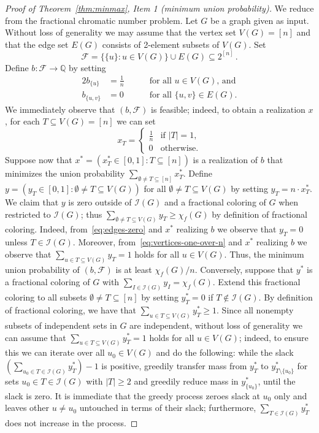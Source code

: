 \documentclass[11pt]{article}
\begin{document}
\begin{proof}[Proof of Theorem~\ref{thm:minmax}, Item 1 (minimum union probability)]
We reduce from the fractional chromatic number problem. 
Let $G$ be a graph given as input.
Without loss of generality we may assume that the vertex set $V(G)=[n]$
and that the edge set $E(G)$ consists of 2-element subsets of $V(G)$.
Set 
\[
\mathcal{F}=\{\{u\}:u\in V(G)\}\cup E(G)\subseteq 2^{[n]}\,.
\]
Define $b:\mathcal{F}\rightarrow\mathbb{Q}$ by setting
\begin{alignat}{2}
\label{eq:vertices-one-over-n}
b_{\{u\}}&=\frac{1}{n}&\quad&\text{ for all $u\in V(G)$, and}\\
\label{eq:edges-zero}
b_{\{u,v\}}&=0&\quad&\text{ for all $\{u,v\}\in E(G)$}.
\end{alignat}
We immediately observe that $(b,\mathcal{F})$ is feasible; indeed,
to obtain a realization $x$, for each $T\subseteq V(G)=[n]$ we can set
\begin{equation}
\label{eq:min-union-feasible}
x_T=\begin{cases}
\frac{1}{n} &\text{if $|T|=1$},\\
0 & \text{otherwise}.
\end{cases}
\end{equation}
Suppose now that $x^*=(x_T^*\in [0,1]:T\subseteq[n])$ is a realization of $b$ 
that minimizes the union probability 
$\sum_{\emptyset\neq T\subseteq [n]}x_T^*$. Define $y=(y_T\in[0,1]:\emptyset\neq T\subseteq V(G))$ for all $\emptyset\neq T\subseteq V(G)$ by setting
$y_T=n\cdot x^*_T$. We claim that $y$ is zero outside of $\mathcal{I}(G)$
and a fractional coloring of $G$ when restricted to $\mathcal{I}(G)$;
thus $\sum_{\emptyset\neq T\subseteq V(G)}y_T\geq\chi_f(G)$ by definition
of fractional coloring. 
Indeed, from~\eqref{eq:edges-zero} and $x^*$ realizing $b$ 
we observe that $y_T=0$ unless $T\in\mathcal{I}(G)$. 
Moreover, from~\eqref{eq:vertices-one-over-n} and $x^*$ realizing $b$ 
we observe that $\sum_{u\in T\subseteq V(G)}y_T=1$ holds for all $u\in V(G)$.
Thus, the minimum union probability of $(b,\mathcal{F})$ is at least 
$\chi_f(G)/n$. Conversely, suppose that
$y^*$ is a fractional coloring of $G$ with 
$\sum_{I\in\mathcal{I}(G)}y_I=\chi_f(G)$. Extend this fractional coloring
to all subsets $\emptyset\neq T\subseteq[n]$ by setting $y^*_T=0$ 
if $T\notin\mathcal{I}(G)$.
By definition of fractional coloring, we have that  
$\sum_{u\in T\subseteq V(G)}y_T^*\geq 1$. Since all nonempty subsets 
of independent sets in $G$ are independent, without loss of generality we 
can assume that $\sum_{u\in T\subseteq V(G)}y_T^*=1$ holds for all $u\in V(G)$;
indeed, to ensure this we can iterate over all $u_0\in V(G)$ and do 
the following: 
while the slack $\left(\sum_{u_0\in T\in\mathcal{I}(G)} y_T^*\right)-1$ is 
positive, greedily transfer mass from $y_T^*$ to $y_{T\setminus\{u_0\}}^*$ 
for sets $u_0\in T\in\mathcal{I}(G)$ with $|T|\ge 2$ and greedily reduce mass 
in $y_{\{u_0\}}^*$, until the slack is zero. It is immediate that the greedy 
process zeroes slack at $u_0$ only and leaves other $u\neq u_0$ 
untouched in terms of their slack; furthermore, 
$\sum_{T\in\mathcal{I}(G)} y_T^*$ does not increase in the process.


\end{proof}
\end{document}

